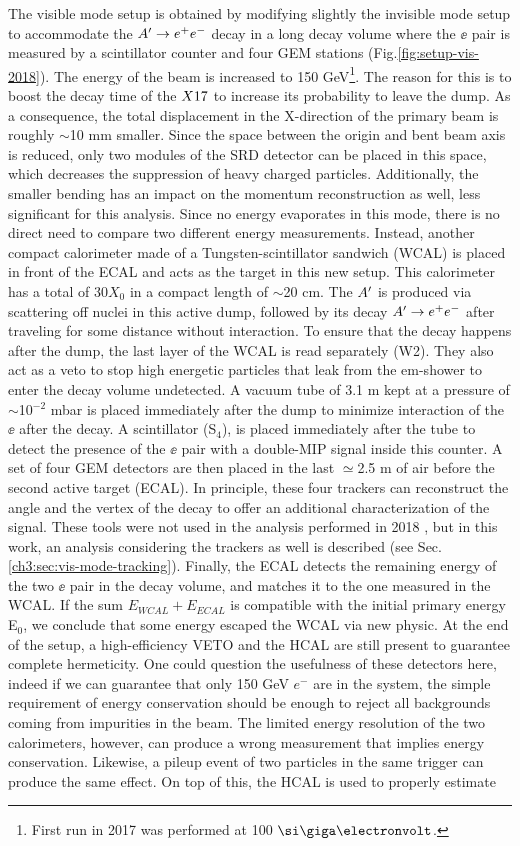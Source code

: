 The visible mode setup is obtained by modifying slightly the invisible mode setup to accommodate the $A' \to e^+e^-$ decay in a long decay volume where the $\ee$ pair is measured by a scintillator counter and four GEM stations (Fig.\ref{fig:setup-vis-2018}). The energy of the beam is increased to 150 GeV\footnote{First run in 2017 was performed at 100 $\gev$.}. The reason for this is to boost the decay time of the $X17$ to increase its probability to leave the dump. As a consequence, the total displacement in the X-direction of the primary beam is roughly $\sim$10 \si{mm} smaller. Since the space between the origin and bent beam axis is reduced, only two modules of the SRD detector can be placed in this space, which decreases the suppression of heavy charged particles. Additionally, the smaller bending has an impact on the momentum reconstruction as well, less significant for this analysis. Since no energy evaporates in this mode, there is no direct need to compare two different energy measurements. Instead, another compact calorimeter made of a Tungsten-scintillator sandwich (WCAL) is placed in front of the ECAL and acts as the target in this new setup. This calorimeter has a total of 30$X_0$ in a compact length of $\sim$20 \si{cm}. The $A'$ is produced via scattering off nuclei in this active dump, followed by its decay $A' \to e^+e^-$ after traveling for some distance without interaction. To ensure that the decay happens after the dump, the last layer of the WCAL is read separately (W2). They also act as a veto to stop high energetic particles that leak from the em-shower to enter the decay volume undetected. A vacuum tube of 3.1 \si{m} kept at a pressure of $\sim$10$^{-2}$ \si{mbar} is placed immediately after the dump to minimize interaction of the $\ee$ after the decay. A scintillator (S$_4$), is placed immediately after the tube to detect the presence of the $\ee$ pair with a double-MIP signal inside this counter. A set of four GEM detectors are then placed in the last $\simeq$2.5 \si{m} of air before the second active target (ECAL). In principle, these four trackers can reconstruct the angle and the vertex of the decay to offer an additional characterization of the signal. These tools were not used in the analysis performed in 2018 \cite{Banerjee:2019hmi}, but in this work, an analysis considering the trackers as well is described (see Sec.\ref{ch3:sec:vis-mode-tracking}). Finally, the ECAL detects the remaining energy of the two $\ee$ pair in the decay volume, and matches it to the one measured in the WCAL. If the sum $E_{WCAL}+E_{ECAL}$ is compatible with the initial primary energy E$_0$, we conclude that some energy escaped the WCAL via new physic. At the end of the setup, a high-efficiency VETO and the HCAL are still present to guarantee complete hermeticity. One could question the usefulness of these detectors here, indeed if we can guarantee that only 150 GeV $e^-$ are in the system, the simple requirement of energy conservation should be enough to reject all backgrounds coming from impurities in the beam. The limited energy resolution of the two calorimeters, however, can produce a wrong measurement that implies energy conservation. Likewise, a pileup event of two particles in the same trigger can produce the same effect. On top of this, the HCAL is used to properly estimate 